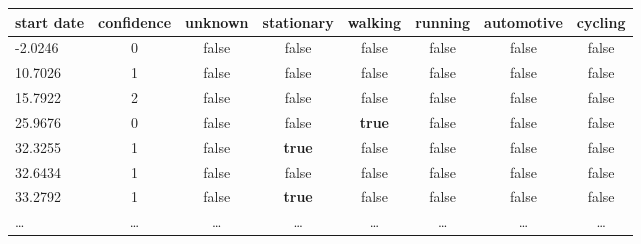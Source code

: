 \begin{tabular}{l*{7}{c}}
start date & confidence & unknown & stationary & walking & running & automotive & cycling \\
\hline
-2.0246 & 0 & false & false & false & false & false & false\\
10.7026 & 1 & false & false & false & false & false & false\\
15.7922 & 2 & false & false & false & false & false & false\\
25.9676 & 0 & false & false & \textbf{true} & false & false & false\\
32.3255 & 1 & false & \textbf{true} & false & false & false & false\\
32.6434 & 1 & false & false & false & false & false & false\\
33.2792 & 1 & false & \textbf{true} & false & false & false & false\\
\dots & \dots & \dots & \dots & \dots & \dots & \dots & \dots
\end{tabular}
